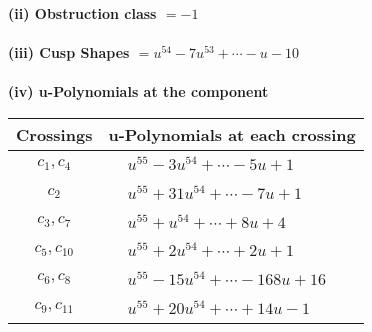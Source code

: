 \documentclass[1p]{elsarticle_modified}
\theoremstyle{definition}
\begin{document}
\flushleft \textbf{(ii) Obstruction class $= -1$}\\~\\
\flushleft \textbf{(iii) Cusp Shapes $= u^{54}-7 u^{53}+\cdots- u-10$}\\~\\
\newpage\renewcommand{\arraystretch}{1}
\flushleft \textbf{(iv) u-Polynomials at the component}\newline \\
\begin{tabular}{m{50pt}|m{274pt}}
Crossings & \hspace{64pt}u-Polynomials at each crossing \\
\hline $$\begin{aligned}c_{1},c_{4}\end{aligned}$$&$\begin{aligned}
&u^{55}-3 u^{54}+\cdots-5 u+1
\end{aligned}$\\
\hline $$\begin{aligned}c_{2}\end{aligned}$$&$\begin{aligned}
&u^{55}+31 u^{54}+\cdots-7 u+1
\end{aligned}$\\
\hline $$\begin{aligned}c_{3},c_{7}\end{aligned}$$&$\begin{aligned}
&u^{55}+u^{54}+\cdots+8 u+4
\end{aligned}$\\
\hline $$\begin{aligned}c_{5},c_{10}\end{aligned}$$&$\begin{aligned}
&u^{55}+2 u^{54}+\cdots+2 u+1
\end{aligned}$\\
\hline $$\begin{aligned}c_{6},c_{8}\end{aligned}$$&$\begin{aligned}
&u^{55}-15 u^{54}+\cdots-168 u+16
\end{aligned}$\\
\hline $$\begin{aligned}c_{9},c_{11}\end{aligned}$$&$\begin{aligned}
&u^{55}+20 u^{54}+\cdots+14 u-1
\end{aligned}$\\
\hline
\end{tabular}\\~\\
\end{document}
